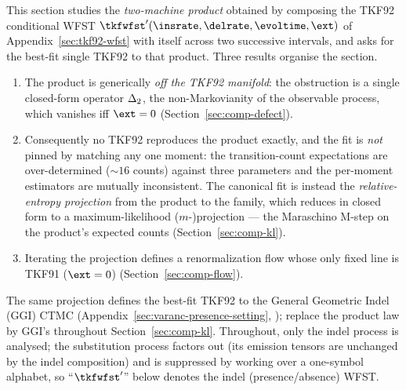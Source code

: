 This section studies the \emph{two-machine product} obtained by composing
the TKF92 conditional WFST
$\tkfwfst'(\insrate,\delrate,\evoltime,\ext)$ of
Appendix~\ref{sec:tkf92-wfst} with itself across two successive intervals,
and asks for the best-fit single TKF92 to that product.  Three results
organise the section.
\begin{enumerate}[nosep]
\item The product is generically \emph{off the TKF92 manifold}: the
  obstruction is a single closed-form operator $\Delta_2$, the
  non-Markovianity of the observable process, which vanishes iff $\ext=0$
  (Section~\ref{sec:comp-defect}).
\item Consequently no TKF92 reproduces the product exactly, and the fit is
  \emph{not} pinned by matching any one moment: the transition-count
  expectations are over-determined ($\sim\!16$ counts) against three
  parameters and the per-moment estimators are mutually inconsistent.  The
  canonical fit is instead the \emph{relative-entropy projection} from the
  product to the family, which reduces in closed form to a
  maximum-likelihood ($m$-)projection --- the Maraschino M-step on the
  product's expected counts (Section~\ref{sec:comp-kl}).
\item Iterating the projection defines a renormalization flow whose only
  fixed line is TKF91 ($\ext=0$) (Section~\ref{sec:comp-flow}).
\end{enumerate}
The same projection defines the best-fit TKF92 to the General Geometric
Indel (GGI) CTMC (Appendix~\ref{sec:varanc-presence-setting},
\cite{Holmes2020}); replace the product law by GGI's throughout
Section~\ref{sec:comp-kl}.  Throughout, only the indel process is analysed;
the substitution process factors out (its emission tensors are unchanged by
the indel composition) and is suppressed by working over a one-symbol
alphabet, so ``$\tkfwfst'$'' below denotes the indel (presence/absence)
WFST.

